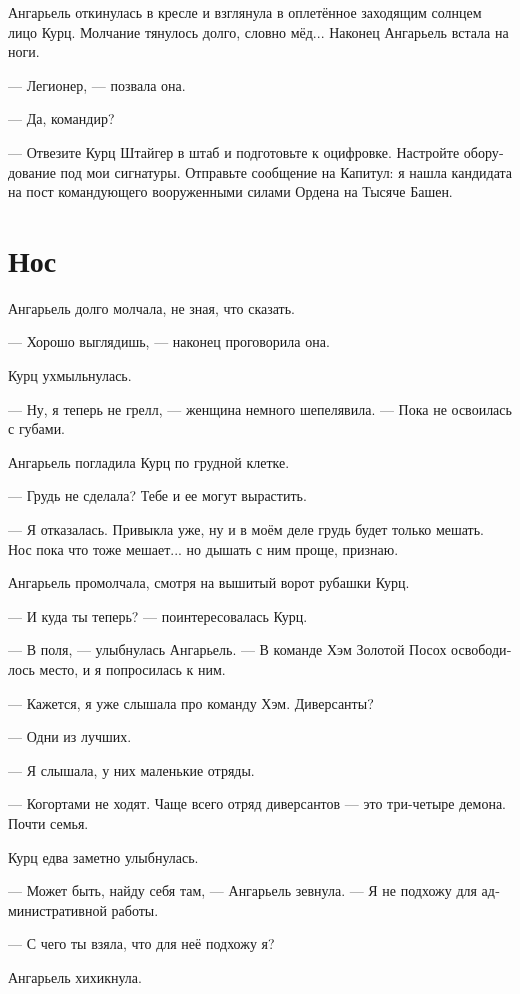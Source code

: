 \documentclass[a4paper,12pt,fleqn]{book}\usepackage{cooltooltips}\usepackage{polyglossia}\setdefaultlanguage[babelshorthands=true]{russian}\setotherlanguage{english}\defaultfontfeatures{Ligatures=TeX,Mapping=tex-text} \usepackage{xcolor}\definecolor{lightgray}{HTML}{bbbbbb}\color{lightgray}\newcommand{\ml}[3]{\textenglish{\textcolor{black}{#3}}}
\begin{document}
Ангарьель откинулась в кресле и взглянула в оплетённое заходящим солнцем лицо Курц.
Молчание тянулось долго, словно мёд...
Наконец Ангарьель встала на ноги.

--- Легионер, --- позвала она.

--- Да, командир?

--- Отвезите Курц Штайгер в штаб и подготовьте к оцифровке.
Настройте оборудование под мои сигнатуры.
Отправьте сообщение на Капитул: я нашла кандидата на пост командующего вооруженными силами Ордена на Тысяче Башен.

\section{Нос}

Ангарьель долго молчала, не зная, что сказать.

--- Хорошо выглядишь, --- наконец проговорила она.

Курц ухмыльнулась.

--- Ну, я теперь не грелл, --- женщина немного шепелявила.
--- Пока не освоилась с губами.

Ангарьель погладила Курц по грудной клетке.

--- Грудь не сделала?
Тебе и ее могут вырастить.

--- Я отказалась.
Привыкла уже, ну и в моём деле грудь будет только мешать.
Нос пока что тоже мешает... но дышать с ним проще, признаю.

Ангарьель промолчала, смотря на вышитый ворот рубашки Курц.

--- И куда ты теперь? --- поинтересовалась Курц.

--- В поля, --- улыбнулась Ангарьель.
--- В команде Хэм Золотой Посох освободилось место, и я попросилась к ним.

--- Кажется, я уже слышала про команду Хэм.
Диверсанты?

--- Одни из лучших.

--- Я слышала, у них маленькие отряды.

--- Когортами не ходят.
Чаще всего отряд диверсантов --- это три-четыре демона.
Почти семья.

Курц едва заметно улыбнулась.

--- Может быть, найду себя там, --- Ангарьель зевнула.
--- Я не подхожу для административной работы.

--- С чего ты взяла, что для неё подхожу я?

Ангарьель хихикнула.
\end{document}
